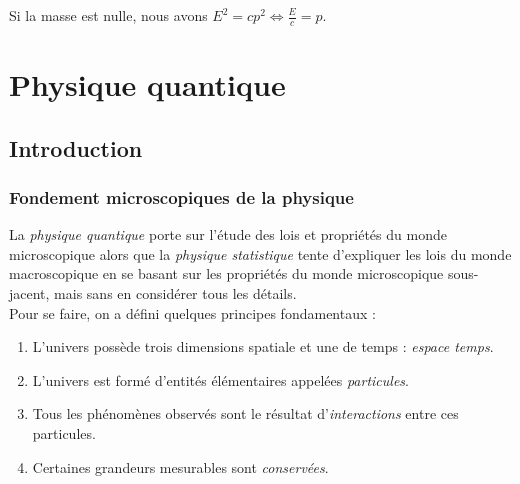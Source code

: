 \documentclass	[11pt, a4paper, openany]{book}
\begin{document}
	Si la masse est nulle, nous avons $E^2 = cp^2 \Leftrightarrow \frac{E}{c} = p$.
	
	\part{Physique quantique}
	\chapter{Introduction}
	\section{Fondement microscopiques de la physique}
	La \textit{physique quantique} porte sur l'étude des lois et propriétés du monde microscopique alors que la \textit{physique statistique} tente d'expliquer les lois du monde macroscopique en se basant sur les propriétés du monde microscopique sous-jacent, mais sans en considérer tous les détails.\\
	Pour se faire, on a défini quelques principes fondamentaux :
	\begin{enumerate}
		\item L'univers possède trois dimensions spatiale et une de temps : \textit{espace temps}.
		\item L'univers est formé d'entités élémentaires appelées \textit{particules}.
		\item Tous les phénomènes observés sont le résultat d'\textit{interactions} entre ces particules.
		\item Certaines grandeurs mesurables sont \textit{conservées}.
	\end{enumerate}
	
\end{document}
